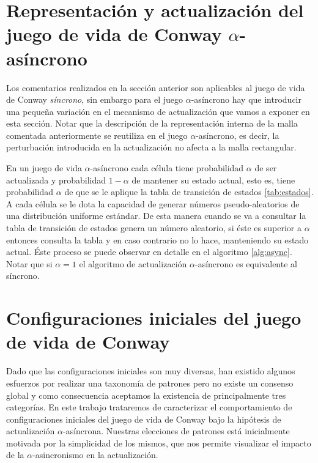 \documentclass[../proyecto.tex]{memoir}
\begin{document}
\section{Representación y actualización del juego de vida de Conway $\alpha$-asíncrono}

Los comentarios realizados en la sección anterior son aplicables al juego de vida de Conway \textit{síncrono}, sin embargo para el juego $\alpha$-asíncrono hay que introducir una pequeña variación en el mecanismo de actualización que vamos a exponer en esta sección. Notar que la descripción de la representación interna de la malla comentada anteriormente se reutiliza en el juego $\alpha$-asíncrono, es decir, la perturbación introducida en la actualización no afecta a la malla rectangular.

En un juego de vida $\alpha$-asíncrono cada célula tiene probabilidad $\alpha$ de ser actualizada y probabilidad $1-\alpha$ de mantener su estado actual, esto es, tiene probabilidad $\alpha$ de que se le aplique la tabla de transición de estados \ref{tab:estados}. A cada célula se le dota la capacidad de generar números pseudo-aleatorios de una distribución uniforme estándar. De esta manera cuando se va a consultar la tabla de transición de estados genera un número aleatorio, si éste es superior a $\alpha$ entonces consulta la tabla y en caso contrario no lo hace, manteniendo su estado actual. Éste proceso se puede observar en detalle en el algoritmo \ref{alg:async}. Notar que si $\alpha=1$ el algoritmo de actualización $\alpha$-asíncrono es equivalente al síncrono.

\section{Configuraciones iniciales del juego de vida de Conway} \label{zoo}

Dado que las configuraciones iniciales son muy diversas, han existido algunos esfuerzos por realizar una taxonomía de patrones pero no existe un consenso global y como consecuencia aceptamos la existencia de principalmente tres categorías. En este trabajo trataremos de caracterizar el comportamiento de configuraciones iniciales del juego de vida de Conway bajo la hipótesis de actualización $\alpha$-asíncrona. Nuestras elecciones de patrones está inicialmente motivada por la simplicidad de los mismos, que nos permite visualizar el impacto de la $\alpha$-asincronismo en la actualización. %
\end{document}

